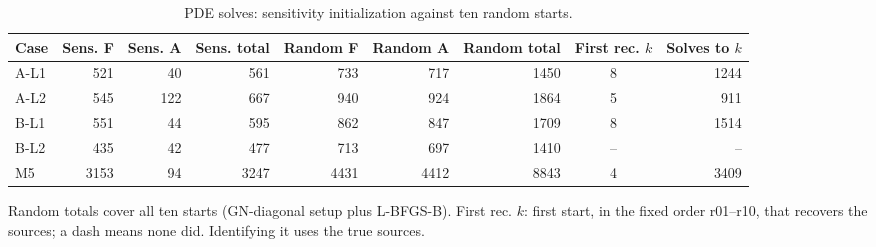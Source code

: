 \begin{table}[htbp]
\centering
\caption{PDE solves: sensitivity initialization against ten random starts.}
\label{tab:table_cost}
\footnotesize
\begin{tabular}{lrrrrrrcr}
\toprule
Case & Sens. F & Sens. A & Sens. total & Random F & Random A & Random total & First rec. $k$ & Solves to $k$ \\
\midrule
A-L1 & 521 & 40 & 561 & 733 & 717 & 1450 & 8 & 1244 \\
A-L2 & 545 & 122 & 667 & 940 & 924 & 1864 & 5 & 911 \\
B-L1 & 551 & 44 & 595 & 862 & 847 & 1709 & 8 & 1514 \\
B-L2 & 435 & 42 & 477 & 713 & 697 & 1410 & -- & -- \\
M5 & 3153 & 94 & 3247 & 4431 & 4412 & 8843 & 4 & 3409 \\
\bottomrule
\end{tabular}
\par\smallskip
\parbox{0.92\linewidth}{\scriptsize Random totals cover all ten starts (GN-diagonal setup plus L-BFGS-B). First rec. $k$: first start, in the fixed order r01--r10, that recovers the sources; a dash means none did. Identifying it uses the true sources.}
\end{table}
